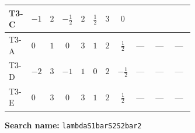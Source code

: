 \documentclass[8pt]{article}
\begin{document}
\begin{landscape}
\begin{longtable}{@{}llcccccc >{\raggedright\arraybackslash}p{0.21\linewidth} >{\raggedright\arraybackslash}p{0.21\linewidth} >{\raggedright\arraybackslash}p{0.21\linewidth}@{}}
T3-C & $-1$ & $2$ & $-\frac{1}{2}$ & $2$ & $\frac{1}{2}$ & $3$ & $0$ & \scriptsize\adjustbox{max width=\linewidth}{$\begin{gathered} -3 {g_Y}^2 {\lambda_{S_1^\dagger S_2 S_2^{\dagger 2}}}\end{gathered}$} & \scriptsize\adjustbox{max width=\linewidth}{$\begin{gathered} +{\lambda_{12}} (6 {\lambda_{S_1^\dagger S_2 S_2^{\dagger 2}}}+6 {\lambda_{S_1 S_1^{\dagger 2}S_2^\dagger}})\end{gathered}$} & \scriptsize\adjustbox{max width=\linewidth}{$\begin{gathered} +{\lambda_{12}^{\rm Adj}} \left(\frac{5 {\lambda_{S_1^\dagger S_2 S_2^{\dagger 2}}}}{6}+\frac{{\lambda_{S_1 S_1^{\dagger 2}S_2^\dagger}}}{6}\right)\end{gathered}$} \\
\midrule
T3-A & $0$ & $1$ & $0$ & $3$ & $1$ & $2$ & $\frac{1}{2}$ & --- & --- & --- \\
\midrule
T3-D & $-2$ & $3$ & $-1$ & $1$ & $0$ & $2$ & $-\frac{1}{2}$ & --- & --- & --- \\
\midrule
T3-E & $0$ & $3$ & $0$ & $3$ & $1$ & $2$ & $\frac{1}{2}$ & --- & --- & --- \\
\midrule
\bottomrule
\end{longtable}
\clearpage
\noindent\textbf{Search name: }\texttt{lambdaS1barS2S2bar2}\par\smallskip

\end{landscape}
\end{document}
